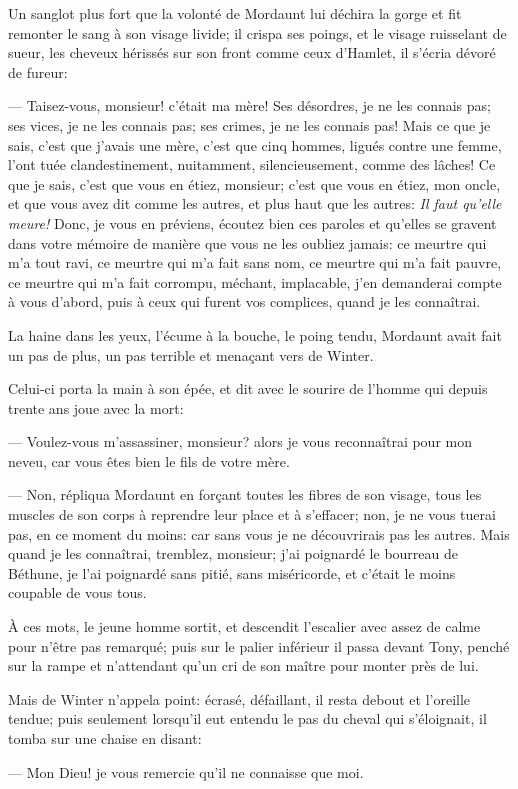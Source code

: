 Un sanglot plus fort que la volonté de Mordaunt lui déchira la gorge et fit remonter le sang à son visage livide; il crispa ses poings, et le visage ruisselant de sueur, les cheveux hérissés sur son front comme ceux d'Hamlet, il s'écria dévoré de fureur:

— Taisez-vous, monsieur! c'était ma mère! Ses désordres, je ne les connais pas; ses vices, je ne les connais pas; ses crimes, je ne les connais pas! Mais ce que je sais, c'est que j'avais une mère, c'est que cinq hommes, ligués contre une femme, l'ont tuée clandestinement, nuitamment, silencieusement, comme des lâches! Ce que je sais, c'est que vous en étiez, monsieur; c'est que vous en étiez, mon oncle, et que vous avez dit comme les autres, et plus haut que les autres: \textit{Il faut qu'elle meure!} Donc, je vous en préviens, écoutez bien ces paroles et qu'elles se gravent dans votre mémoire de manière que vous ne les oubliez jamais: ce meurtre qui m'a tout ravi, ce meurtre qui m'a fait sans nom, ce meurtre qui m'a fait pauvre, ce meurtre qui m'a fait corrompu, méchant, implacable, j'en demanderai compte à vous d'abord, puis à ceux qui furent vos complices, quand je les connaîtrai.

La haine dans les yeux, l'écume à la bouche, le poing tendu, Mordaunt avait fait un pas de plus, un pas terrible et menaçant vers de Winter.

Celui-ci porta la main à son épée, et dit avec le sourire de l'homme qui depuis trente ans joue avec la mort:

— Voulez-vous m'assassiner, monsieur? alors je vous reconnaîtrai pour mon neveu, car vous êtes bien le fils de votre mère.

— Non, répliqua Mordaunt en forçant toutes les fibres de son visage, tous les muscles de son corps à reprendre leur place et à s'effacer; non, je ne vous tuerai pas, en ce moment du moins: car sans vous je ne découvrirais pas les autres. Mais quand je les connaîtrai, tremblez, monsieur; j'ai poignardé le bourreau de Béthune, je l'ai poignardé sans pitié, sans miséricorde, et c'était le moins coupable de vous tous.

À ces mots, le jeune homme sortit, et descendit l'escalier avec assez de calme pour n'être pas remarqué; puis sur le palier inférieur il passa devant Tony, penché sur la rampe et n'attendant qu'un cri de son maître pour monter près de lui.

Mais de Winter n'appela point: écrasé, défaillant, il resta debout et l'oreille tendue; puis seulement lorsqu'il eut entendu le pas du cheval qui s'éloignait, il tomba sur une chaise en disant:

— Mon Dieu! je vous remercie qu'il ne connaisse que moi.